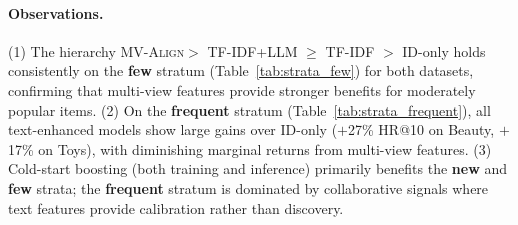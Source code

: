 \documentclass[sigconf,natbib=true]{acmart}
\newcommand{\model}{\textsc{MV-Align}\xspace}
\begin{document}
\paragraph{Observations.}
(1) The hierarchy \model $>$ TF-IDF+LLM $\geq$ TF-IDF $>$ ID-only 
holds consistently on the \textbf{few} stratum (Table~\ref{tab:strata_few})
for both datasets, confirming that multi-view features provide stronger
benefits for moderately popular items.
(2) On the \textbf{frequent} stratum (Table~\ref{tab:strata_frequent}), 
all text-enhanced models show large gains over ID-only ($+$27\% HR@10 on 
Beauty, $+$17\% on Toys), with diminishing marginal returns from 
multi-view features.
(3) Cold-start boosting (both training and inference) primarily benefits 
the \textbf{new} and \textbf{few} strata; the \textbf{frequent} stratum 
is dominated by collaborative signals where text features provide 
calibration rather than discovery.


\end{document}
